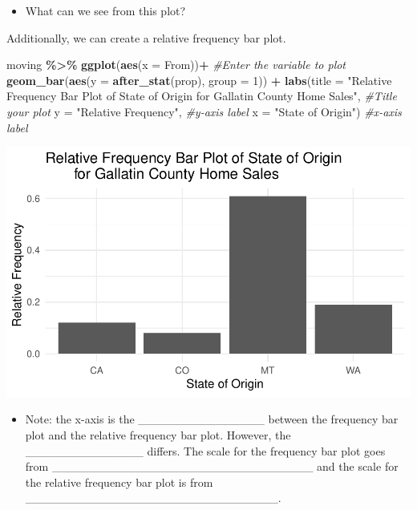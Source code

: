 \documentclass[
]{report}
\newenvironment{Shaded}{\begin{snugshade}}{\end{snugshade}}
\newcommand{\AttributeTok}[1]{\textcolor[rgb]{0.13,0.29,0.53}{#1}}
\newcommand{\CommentTok}[1]{\textcolor[rgb]{0.56,0.35,0.01}{\textit{#1}}}
\newcommand{\DecValTok}[1]{\textcolor[rgb]{0.00,0.00,0.81}{#1}}
\newcommand{\FunctionTok}[1]{\textcolor[rgb]{0.13,0.29,0.53}{\textbf{#1}}}
\newcommand{\NormalTok}[1]{#1}
\newcommand{\SpecialCharTok}[1]{\textcolor[rgb]{0.81,0.36,0.00}{\textbf{#1}}}
\newcommand{\StringTok}[1]{\textcolor[rgb]{0.31,0.60,0.02}{#1}}
\providecommand{\tightlist}{%
  \setlength{\itemsep}{0pt}\setlength{\parskip}{0pt}}
\begin{document}
\begin{itemize}
\tightlist
\item
  What can we see from this plot?
\end{itemize}

\vspace{0.3in}

Additionally, we can create a relative frequency bar plot.

\begin{Shaded}
\begin{Highlighting}[]
\NormalTok{moving }\SpecialCharTok{\%\textgreater{}\%}
  \FunctionTok{ggplot}\NormalTok{(}\FunctionTok{aes}\NormalTok{(}\AttributeTok{x =}\NormalTok{ From))}\SpecialCharTok{+} \CommentTok{\#Enter the variable to plot}
  \FunctionTok{geom\_bar}\NormalTok{(}\FunctionTok{aes}\NormalTok{(}\AttributeTok{y =} \FunctionTok{after\_stat}\NormalTok{(prop), }\AttributeTok{group =} \DecValTok{1}\NormalTok{)) }\SpecialCharTok{+}
  \FunctionTok{labs}\NormalTok{(}\AttributeTok{title =} \StringTok{"Relative Frequency Bar Plot of State of Origin }
\StringTok{       for Gallatin County Home Sales"}\NormalTok{, }
       \CommentTok{\#Title your plot}
       \AttributeTok{y =} \StringTok{"Relative Frequency"}\NormalTok{, }\CommentTok{\#y{-}axis label}
       \AttributeTok{x =} \StringTok{"State of Origin"}\NormalTok{) }\CommentTok{\#x{-}axis label}
\end{Highlighting}
\end{Shaded}

\begin{center}\includegraphics[width=0.65\linewidth]{03-VN03-EDA_OneCatSimulation_files/figure-latex/unnamed-chunk-6-1} \end{center}


\begin{itemize}
\tightlist
\item
  Note: the x-axis is the \_\_\_\_\_\_\_\_\_\_\_\_\_\_\_ between the frequency bar plot and the relative frequency bar plot. However, the \_\_\_\_\_\_\_\_\_\_\_\_\_\_ differs. The scale for the frequency bar plot goes from \_\_\_\_\_\_\_\_\_\_\_\_\_\_\_\_\_\_\_\_\_\_\_\_\_\_\_\_\_\_\_ and the scale for the relative frequency bar plot is from \_\_\_\_\_\_\_\_\_\_\_\_\_\_\_\_\_\_\_\_\_\_\_\_\_\_\_\_\_\_.
\end{itemize}
\end{document}
